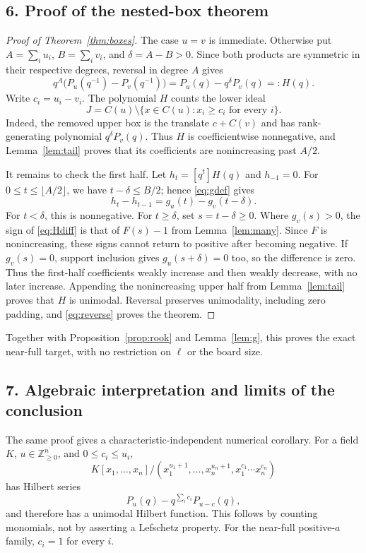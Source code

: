 \documentclass[11pt]{article}
\newcommand{\NN}{\mathbb Z_{\ge0}}
\begin{document}
\subsection*{6. Proof of the nested-box theorem}
\begin{proof}[Proof of Theorem~\ref{thm:boxes}]
The case $u=v$ is immediate. Otherwise put
$A=\sum_i u_i$, $B=\sum_i v_i$, and $\delta=A-B>0$.
Since both products are symmetric in their respective degrees, reversal
in degree $A$ gives
\begin{equation}\label{eq:reverse}
 q^A\bigl(P_u(q^{-1})-P_v(q^{-1})\bigr)
 =P_u(q)-q^\delta P_v(q)=:H(q).
\end{equation}
Write $c_i=u_i-v_i$. The polynomial $H$ counts the lower ideal
\[
 J=C(u)\setminus
   \{x\in C(u):x_i\ge c_i\text{ for every }i\}.
\]
Indeed, the removed upper box is the translate $c+C(v)$ and has
rank-generating polynomial $q^\delta P_v(q)$. Thus $H$ is coefficientwise
nonnegative, and Lemma~\ref{lem:tail} proves that its coefficients are
nonincreasing past $A/2$.

It remains to check the first half. Let $h_t=[q^t]H(q)$ and $h_{-1}=0$.
For $0\le t\le\lfloor A/2\rfloor$, we have
$t-\delta\le B/2$; hence \eqref{eq:gdef} gives
\begin{equation}\label{eq:Hdiff}
 h_t-h_{t-1}=g_u(t)-g_v(t-\delta).
\end{equation}
For $t<\delta$, this is nonnegative. For $t\ge\delta$, set
$s=t-\delta\ge0$. Where $g_v(s)>0$, the sign of \eqref{eq:Hdiff} is
that of $F(s)-1$ from Lemma~\ref{lem:many}. Since $F$ is nonincreasing,
these signs cannot return to positive after becoming negative.
If $g_v(s)=0$, support inclusion gives $g_u(s+\delta)=0$ too, so the
difference is zero. Thus the first-half coefficients weakly increase
and then weakly decrease, with no later increase. Appending the
nonincreasing upper half from Lemma~\ref{lem:tail} proves that $H$ is
unimodal. Reversal preserves unimodality, including zero padding, and
\eqref{eq:reverse} proves the theorem.
\end{proof}
Together with Proposition~\ref{prop:rook} and Lemma~\ref{lem:g}, this proves
the exact near-full target, with no restriction on $\ell$ or the board size.

\subsection*{7. Algebraic interpretation and limits of the conclusion}
The same proof gives a characteristic-independent numerical corollary.
For a field $K$, $u\in\NN^n$, and $0\le c_i\le u_i$,
\[
 K[x_1,\ldots,x_n]/
 (x_1^{u_1+1},\ldots,x_n^{u_n+1},x_1^{c_1}\cdots x_n^{c_n})
\]
has Hilbert series
\[
 P_u(q)-q^{\sum_i c_i}P_{u-c}(q),
\]
and therefore has a unimodal Hilbert function. This follows by counting
monomials, not by asserting a Lefschetz property. For the near-full
positive-$a$ family, $c_i=1$ for every $i$.
\end{document}
